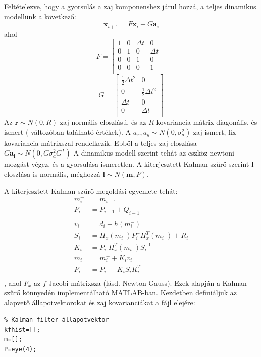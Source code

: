\begin{answer}
	Feltételezve, hogy a gyorsulás a zaj komponenshez járul hozzá, a teljes dinamikus modellünk a következő:
	\begin{equation}
		\mathbf{x}_{i+1} = F\mathbf{x}_i + G\mathbf{a}_i
	\end{equation}
	ahol
	\begin{equation}
		F=\begin{bmatrix}
			1 & 0 & \Delta t & 0 \\
			0 & 1 & 0 & \Delta t \\
			0 & 0 & 1 & 0 \\
			0 & 0 & 0 & 1 \\
		\end{bmatrix}
	\end{equation}
	\begin{equation}
		G=\begin{bmatrix}
			\frac{1}{2} \Delta t^2 & 0 \\
			0 & \frac{1}{2} \Delta t^2 \\
			\Delta t & 0 \\
			0 & \Delta t \\
		\end{bmatrix}
	\end{equation}
	Az $\mathbf{r}\sim N(0,R)$ zaj normális eloszlású, és az $R$ kovariancia mátrix diagonális, és ismert ( változóban található értékek). A $a_x,a_y\sim N(0,\sigma_a^2)$ zaj ismert, fix kovariancia mátrixszal rendelkezik. Ebből a teljes zaj eloszlása $G\mathbf{a_i} \sim N(0,G \sigma_a^2 G^T)$ A dinamikus modell szerint tehát az eszköz newtoni mozgást végez, és a gyorsulása ismeretlen. A kiterjesztett Kalman-szűrő szerint $\mathbf{l}$ eloszlása is normális, méghozzá $\mathbf{l}\sim N(\mathbf{m},P)$. 
	
	A kiterjesztett Kalman-szűrő megoldási egyenlete tehát:
	\begin{equation}
	\begin{split}
	m_i^- &= m_{i-1} \\
	P_i^- &= P_{i-1}+Q_{i-1} \\
	\\
	v_i &= d_i-h(m_i^-) \\
	S_i &= H_x(m_i^-) P_i^- H_x^T(m_i^-)+R_i \\
	K_i &= P_i^- H_x^T(m_i^-) S_i^{-1} \\
	m_i &= m_i^- + K_i v_i \\
	P_i &= P_i^- - K_i S_i K_i^T \\
	\end{split}
	\end{equation}
	, ahol $F_x$ az $f$ Jacobi-mátrixsza (lásd. Newton-Gauss). Ezek alapján a Kalman-szűrő könnyedén implementálható MATLAB-ban. Kezdetben definiáljuk az alapvető állapotvektorokat és zaj kovarianciákat a fájl elejére:
	\begin{lstlisting}
% Kalman filter állapotvektor
kfhist=[];
m=[];
P=eye(4);


\end{lstlisting}
\end{answer}
